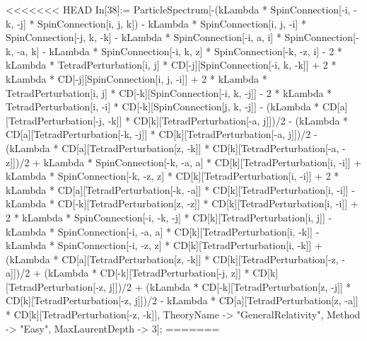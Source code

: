 <<<<<<< HEAD
In[38]:= ParticleSpectrum[-(kLambda * SpinConnection[-i, -k, -j] * SpinConnection[i, j, k]) - kLambda * SpinConnection[i, j, -i] * SpinConnection[-j, k, -k] - kLambda * SpinConnection[-i, a, i] * SpinConnection[-k, -a, k] - kLambda * SpinConnection[-i, k, z] * SpinConnection[-k, -z, i] - 2 * kLambda * TetradPerturbation[i, j] * CD[-j][SpinConnection[-i, k, -k]] + 2 * kLambda * CD[-j][SpinConnection[i, j, -i]] + 2 * kLambda * TetradPerturbation[i, j] * CD[-k][SpinConnection[-i, k, -j]] - 2 * kLambda * TetradPerturbation[i, -i] * CD[-k][SpinConnection[j, k, -j]] - (kLambda * CD[a][TetradPerturbation[-j, -k]] * CD[k][TetradPerturbation[-a, j]])/2 - (kLambda * CD[a][TetradPerturbation[-k, -j]] * CD[k][TetradPerturbation[-a, j]])/2 - (kLambda * CD[a][TetradPerturbation[z, -k]] * CD[k][TetradPerturbation[-a, -z]])/2 + kLambda * SpinConnection[-k, -a, a] * CD[k][TetradPerturbation[i, -i]] + kLambda * SpinConnection[-k, -z, z] * CD[k][TetradPerturbation[i, -i]] + 2 * kLambda * CD[a][TetradPerturbation[-k, -a]] * CD[k][TetradPerturbation[i, -i]] - kLambda * CD[-k][TetradPerturbation[z, -z]] * CD[k][TetradPerturbation[i, -i]] + 2 * kLambda * SpinConnection[-i, -k, -j] * CD[k][TetradPerturbation[i, j]] - kLambda * SpinConnection[-i, -a, a] * CD[k][TetradPerturbation[i, -k]] - kLambda * SpinConnection[-i, -z, z] * CD[k][TetradPerturbation[i, -k]] + (kLambda * CD[a][TetradPerturbation[z, -k]] * CD[k][TetradPerturbation[-z, -a]])/2 + (kLambda * CD[-k][TetradPerturbation[-j, z]] * CD[k][TetradPerturbation[-z, j]])/2 + (kLambda * CD[-k][TetradPerturbation[z, -j]] * CD[k][TetradPerturbation[-z, j]])/2 - kLambda * CD[a][TetradPerturbation[z, -a]] * CD[k][TetradPerturbation[-z, -k]], TheoryName -> "GeneralRelativity", Method -> "Easy", MaxLaurentDepth -> 3]; 
=======
